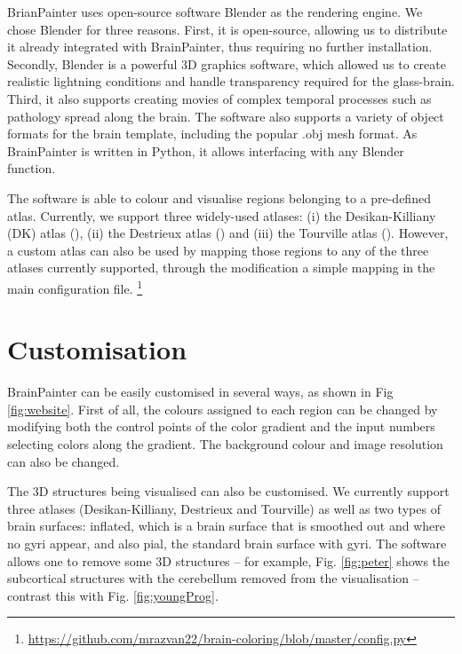 \documentclass[final,times,twocolumn,authoryear]{elsarticle}
\begin{document}
BrianPainter uses open-source software Blender as the rendering engine. We chose Blender for three reasons. First, it is open-source, allowing us to distribute it already integrated with BrainPainter, thus requiring no further installation. Secondly, Blender is a powerful 3D graphics software, which allowed us to create realistic lightning conditions and handle transparency required for the glass-brain. Third, it also supports creating movies of complex temporal processes such as pathology spread along the brain. The software also supports a variety of object formats for the brain template, including the popular .obj mesh format. As BrainPainter is written in Python, it allows interfacing with any Blender function.

The software is able to colour and visualise regions belonging to a pre-defined atlas. Currently, we support three widely-used atlases: (i) the Desikan-Killiany (DK) atlas (\cite{desikan2006automated}), (ii) the Destrieux atlas (\cite{destrieux2010automatic}) and (iii) the Tourville atlas (\cite{klein2012101}). However, a custom atlas can also be used by mapping those regions to any of the three atlases currently supported, through the modification a simple mapping in the main configuration file. \footnote{\url{https://github.com/mrazvan22/brain-coloring/blob/master/config.py}}





\section{Customisation}
\label{customisation}


BrainPainter can be easily customised in several ways, as shown in Fig \ref{fig:website}. First of all, the colours assigned to each region can be changed by modifying both the control points of the color gradient and the input numbers selecting colors along the gradient. The background colour and image resolution can also be changed.  

The 3D structures being visualised can also be customised. We currently support three atlases (Desikan-Killiany, Destrieux and Tourville) as well as two types of brain surfaces: inflated, which is a brain surface that is smoothed out and where no gyri appear, and also pial, the standard brain surface with gyri. The software allows one to remove some 3D structures -- for example, Fig. \ref{fig:peter} shows the subcortical structures with the cerebellum removed from the visualisation -- contrast this with Fig. \ref{fig:youngProg}. 
 
\end{document}
